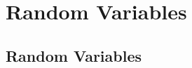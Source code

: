 \chapter{Random Variables}
\label{ch:randomvars}
\setlength{\parindent}{1em}

\section{Random Variables}
